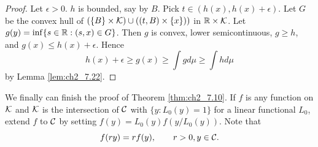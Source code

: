 \begin{proof}
Let $\epsilon > 0$. $h$ is bounded, say by $B$. Pick $t \in (h(x), h(x) + \epsilon)$. Let $G$ be the convex hull of $(\{B\} \times \mathcal{K}) \cup ((t, B) \times \{x\}))$ in $\mathbb{R} \times \mathcal{K}$. Let $g(y) = \inf\{s \in \mathbb{R} : (s,x) \in G\}$. Then $g$ is convex, lower semicontinuous, $g \geq h$, and $g(x) \leq h(x) + \epsilon$. Hence
\[
    h(x) + \epsilon \geq g(x) \geq \int gd\mu \geq \int hd\mu
\]
by Lemma \ref{lem:ch2_7.22}.
\end{proof}

We finally can finish the proof of Theorem \ref{thm:ch2_7.10}. If $f$ is any function on $\mathcal{K}$ and $\mathcal{K}$ is the intersection of $\mathcal{C}$ with $\{y : L_0(y) = 1\}$ for a linear functional $L_0$, extend $f$ to $\mathcal{C}$ by setting $f(y) = L_0(y)f(y/L_0(y))$. Note that
\begin{equation}\label{eq:ch2_7.12}
    f(ry) = rf(y), \qquad r > 0, y \in \mathcal{C}.
\end{equation}

